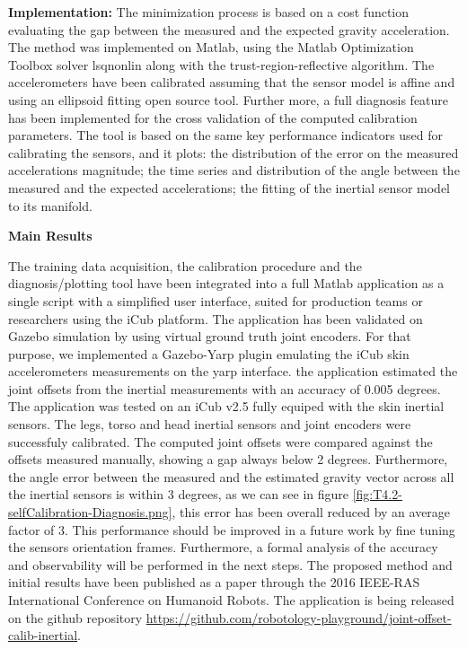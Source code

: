 \textbf*{Implementation:}
The minimization process is based on a cost function evaluating the gap between the measured and the expected gravity acceleration. The method was implemented on Matlab, using the Matlab Optimization Toolbox solver lsqnonlin along with the trust-region-reflective algorithm. The accelerometers  have been calibrated assuming that the sensor model is affine and using an ellipsoid fitting open source tool. Further more, a full diagnosis feature has been implemented for the cross validation of the computed calibration parameters. The tool is based on the same key performance indicators used for calibrating the sensors, and it plots: the distribution of the error on the measured accelerations magnitude; the time series and distribution of the angle between the measured and the expected accelerations; the fitting of the inertial sensor model to its manifold.

\textbf{Main Results}

The training data acquisition, the calibration procedure and the diagnosis/plotting tool have been integrated into a full Matlab application as a single script with a simplified user interface, suited for production teams or researchers using the iCub platform. The application has been validated on Gazebo simulation by using virtual ground truth joint encoders. For that purpose, we implemented a Gazebo-Yarp plugin emulating the iCub skin accelerometers measurements on the yarp interface. the application estimated the joint offsets from the inertial measurements with an accuracy of 0.005 degrees.
The application was tested on an iCub v2.5 fully equiped with the skin inertial sensors. The legs, torso and head inertial sensors and joint encoders were successfuly calibrated. The computed joint offsets were compared against the offsets measured manually, showing a gap always below 2 degrees. Furthermore, the angle error between the measured and the estimated gravity vector across all the inertial sensors is within 3 degrees, as we can see in figure \ref{fig:T4.2-selfCalibration-Diagnosis.png}, this error has been overall reduced by an average factor of 3. This performance should be improved in a future work by fine tuning the sensors orientation frames.
Furthermore, a formal analysis of the accuracy and observability will be performed in the next steps. The proposed method and initial results have been published as a paper \cite{GuedelhaSelfCalibJointOffsets2016} through the 2016 IEEE-RAS International Conference on Humanoid Robots. The application is being released on the github repository \url{https://github.com/robotology-playground/joint-offset-calib-inertial}.

